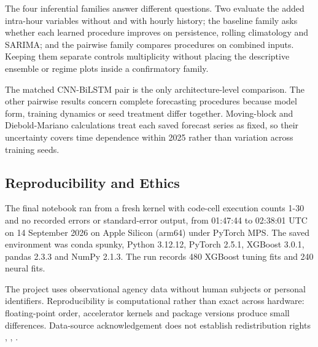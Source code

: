 The four inferential families answer different questions. Two evaluate the added intra-hour variables without and with hourly history; the baseline family asks whether each learned procedure improves on persistence, rolling climatology and SARIMA; and the pairwise family compares procedures on combined inputs. Keeping them separate controls multiplicity without placing the descriptive ensemble or regime plots inside a confirmatory family.

The matched CNN-\allowbreak{}BiLSTM pair is the only architecture-level comparison. The other pairwise results concern complete forecasting procedures because model form, training dynamics or seed treatment differ together. Moving-block and Diebold-Mariano calculations treat each saved forecast series as fixed, so their uncertainty covers time dependence within 2025 rather than variation across training seeds.

\subsection{Reproducibility and Ethics}

The final notebook ran from a fresh kernel with code-cell execution counts 1-30 and no recorded errors or standard-error output, from 01:47:44 to 02:38:01 UTC on 14 September 2026 on Apple Silicon (arm64) under PyTorch MPS. The saved environment was conda spunky, Python 3.12.12, PyTorch 2.5.1, XGBoost 3.0.1, pandas 2.3.3 and NumPy 2.1.3. The run records 480 XGBoost tuning fits and 240 neural fits.

The project uses observational agency data without human subjects or personal identifiers. Reproducibility is computational rather than exact across hardware: floating-point order, accelerator kernels and package versions produce small differences. Data-source acknowledgement does not establish redistribution rights \cite{pfenninger2016longterm}, \cite{renewables2025api}, \cite{aemo2024nemosis}.
